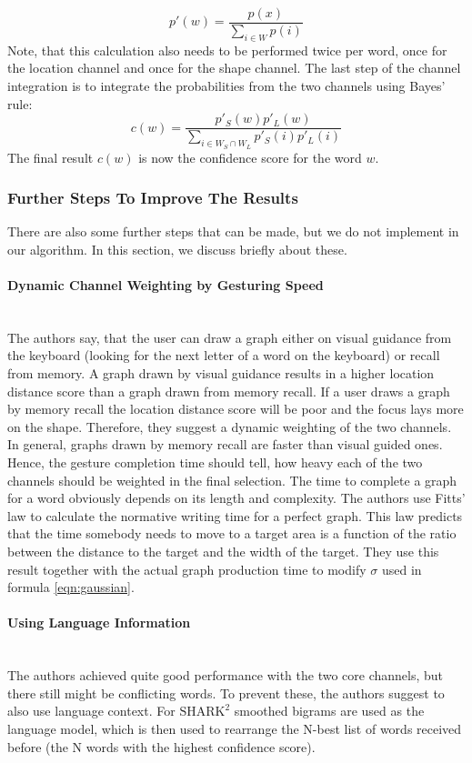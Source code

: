 \begin{equation}
    p'(w) = \frac{p(x)}{\sum\limits_{i \in W}p(i)}
\end{equation}
Note, that this calculation also needs to be performed twice per word, once for the location channel and once for the shape channel. The last step of the channel integration is to integrate the probabilities from the two channels using Bayes' rule:
\begin{equation}
    c(w) = \frac{p'_S(w)p'_L(w)}{\sum\limits_{i \in W_S \cap W_L}p'_S(i)p'_L(i)}
\end{equation}
The final result $c(w)$ is now the confidence score for the word $w$.

\subsubsection{Further Steps To Improve The Results}
There are also some further steps that can be made, but we do not implement in our algorithm. In this section, we discuss briefly about these.
\paragraph{Dynamic Channel Weighting by Gesturing Speed}\
\label{gesturing speed}\\
The authors say, that the user can draw a graph either on visual guidance from the keyboard (looking for the next letter of a word on the keyboard) or recall from memory. A graph drawn by visual guidance results in a higher location distance score than a graph drawn from memory recall. If a user draws a graph by memory recall the location distance score will be poor and the focus lays more on the shape. Therefore, they suggest a dynamic weighting of the two channels. In general, graphs drawn by memory recall are faster than visual guided ones. Hence, the gesture completion time should tell, how heavy each of the two channels should be weighted in the final selection. The time to complete a graph for a word obviously depends on its length and complexity. The authors use Fitts' law to calculate the normative writing time for a perfect graph. This law predicts that the time somebody needs to move to a target area is a function of the ratio between the distance to the target and the width of the target. They use this result together with the actual graph production time to modify $\sigma$ used in formula \ref{eqn:gaussian}.\\
\paragraph{Using Language Information}\ \\
The authors achieved quite good performance with the two core channels, but there still might be conflicting words. To prevent these, the authors suggest to also use language context. For $\text{SHARK}^2$ smoothed bigrams are used as the language model, which is then used to rearrange the N-best list of words received before (the N words with the highest confidence score).

